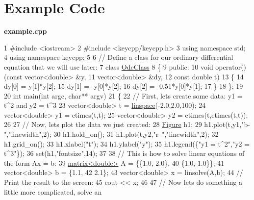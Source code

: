 \section*{Example Code}

{\bfseries {\ttfamily example.\-cpp}} 
\begin{DoxyCodeInclude}
1 \textcolor{preprocessor}{#include <iostream>}
2 \textcolor{preprocessor}{#include <keycpp/keycpp.h>}
3 \textcolor{keyword}{using namespace }std;
4 \textcolor{keyword}{using namespace }keycpp;
5 
6 \textcolor{comment}{// Define a class for our ordinary differential equation that we will use later:}
7 \textcolor{keyword}{class }\hyperlink{class_ode_class}{OdeClass}
8 \{
9     \textcolor{keyword}{public}:
10         \textcolor{keywordtype}{void} operator()(\textcolor{keyword}{const} vector<double> &y,
11                         vector<double> &dy,
12                         \textcolor{keyword}{const} \textcolor{keywordtype}{double} t)
13         \{
14             dy[0] = y[1]*y[2];
15             dy[1] = -y[0]*y[2];
16             dy[2] = -0.51*y[0]*y[1];
17         \}
18 \};
19 
20 \textcolor{keywordtype}{int} main(\textcolor{keywordtype}{int} argc, \textcolor{keywordtype}{char}** argv)
21 \{
22     \textcolor{comment}{// First, lets create some data: y1 = t^2 and y2 = t^3}
23     vector<double> t = \hyperlink{namespacekeycpp_ab57eee495c93eb18ebf8c8ccf4d44e74}{linspace}(-2.0,2.0,100);
24     vector<double> y1 = etimes(t,t);
25     vector<double> y2 = etimes(t,etimes(t,t));
26 
27     \textcolor{comment}{// Now, lets plot the data we just created:}
28     \hyperlink{classkeycpp_1_1_figure}{Figure} h1;
29     h1.plot(t,y1,\textcolor{stringliteral}{"b-"},\textcolor{stringliteral}{"linewidth"},2);
30     h1.hold\_on();
31     h1.plot(t,y2,\textcolor{stringliteral}{"r--"},\textcolor{stringliteral}{"linewidth"},2);
32     h1.grid\_on();
33     h1.xlabel(\textcolor{stringliteral}{"t"});
34     h1.ylabel(\textcolor{stringliteral}{"y"});
35     h1.legend(\{\textcolor{stringliteral}{"y1 = t^2"},\textcolor{stringliteral}{"y2 = t^3"}\});
36     \textcolor{keyword}{set}(h1,\textcolor{stringliteral}{"fontsize"},14);
37 
38     \textcolor{comment}{// This is how to solve linear equations of the form Ax = b:}
39     \hyperlink{classkeycpp_1_1matrix}{matrix<double>} A = \{\{1.0, 2.0\},
40                         \{1.0,-1.0\}\};
41     vector<double> b = \{1.1,
42                         2.1\};
43     vector<double> x = linsolve(A,b);
44     \textcolor{comment}{// Print the result to the screen:}
45     cout << x;
46 
47     \textcolor{comment}{// Now lets do something a little more complicated, solve an}

\end{DoxyCodeInclude}
